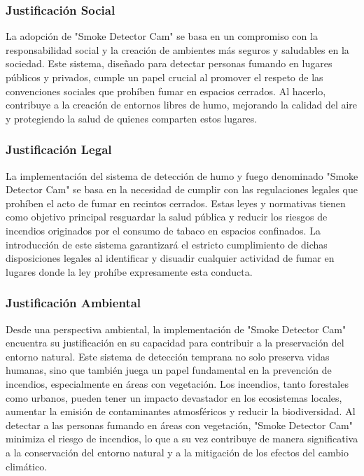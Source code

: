 \subsubsection{Justificación Social} 
La adopción de "Smoke Detector Cam" se basa en un compromiso con la responsabilidad social y la creación de ambientes más seguros y saludables en la sociedad. Este sistema, diseñado para detectar personas fumando en lugares públicos y privados, cumple un papel crucial al promover el respeto de las convenciones sociales que prohíben fumar en espacios cerrados. Al hacerlo, contribuye a la creación de entornos libres de humo, mejorando la calidad del aire y protegiendo la salud de quienes comparten estos lugares. 
\subsubsection{Justificación Legal} 
La implementación del sistema de detección de humo y fuego denominado "Smoke Detector Cam" se basa en la necesidad de cumplir con las regulaciones legales que prohíben el acto de fumar en recintos cerrados. Estas leyes y normativas tienen como objetivo principal resguardar la salud pública y reducir los riesgos de incendios originados por el consumo de tabaco en espacios confinados. La introducción de este sistema garantizará el estricto cumplimiento de dichas disposiciones legales al identificar y disuadir cualquier actividad de fumar en lugares donde la ley prohíbe expresamente esta conducta.
\subsubsection{Justificación Ambiental} 
Desde una perspectiva ambiental, la implementación de "Smoke Detector Cam" 
 encuentra su justificación en su capacidad para contribuir a la preservación del entorno natural. Este sistema de detección temprana no solo preserva vidas humanas, sino que también juega un papel fundamental en la prevención de incendios, especialmente en áreas con vegetación. Los incendios, tanto forestales como urbanos, pueden tener un impacto devastador en los ecosistemas locales, aumentar la emisión de contaminantes atmosféricos y reducir la biodiversidad. Al detectar a las personas fumando en áreas con vegetación, "Smoke Detector Cam" minimiza el riesgo de incendios, lo que a su vez contribuye de manera significativa a la conservación del entorno natural y a la mitigación de los efectos del cambio climático.

